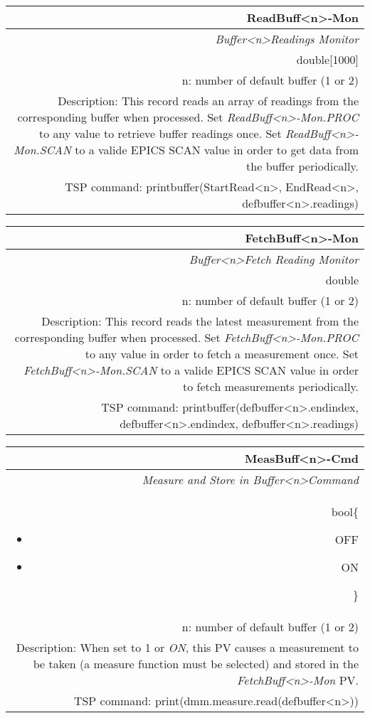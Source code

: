 \documentclass[openany]{article}
\begin{document}
		\begin{tabular}{N}
			\hline
			\bfseries ReadBuff\textless n\textgreater-Mon\label{pv:readbuff-mon} \\ \hline
			\emph{Buffer\textless n\textgreater Readings Monitor} \\
			double[1000] \\
			n: number of default buffer (1 or 2) \\
			Description: This record reads an array of readings from the corresponding buffer when processed.  Set \emph{ReadBuff\textless n\textgreater-Mon.PROC} to any value to retrieve buffer readings once. Set \emph{ReadBuff\textless n\textgreater-Mon.SCAN} to a valide EPICS SCAN value in order to get data from the buffer periodically. \\
			TSP command: printbuffer(StartRead\textless n\textgreater, EndRead\textless n\textgreater, defbuffer\textless n\textgreater.readings)
		\end{tabular}

		\begin{tabular}{N}
			\hline
			\bfseries FetchBuff\textless n\textgreater-Mon\label{pv:fetchbuff-mon} \\ \hline
			\emph{Buffer\textless n\textgreater Fetch Reading Monitor} \\
			double \\
			n: number of default buffer (1 or 2) \\
			Description: This record reads the latest measurement from the corresponding buffer when processed. Set \emph{FetchBuff\textless n\textgreater-Mon.PROC} to any value in order to fetch a measurement once. Set \emph{FetchBuff\textless n\textgreater-Mon.SCAN} to a valide EPICS SCAN value in order to fetch measurements periodically. \\
			TSP command: printbuffer(defbuffer\textless n\textgreater.endindex, defbuffer\textless n\textgreater.endindex, defbuffer\textless n\textgreater.readings)
		\end{tabular}

		\begin{tabular}{N}
			\hline
			\bfseries MeasBuff\textless n\textgreater-Cmd\label{pv:measbuff-cmd} \\ \hline
			\emph{Measure and Store in Buffer\textless n\textgreater Command} \\
			bool\{\begin{itemize}[noitemsep]
				\small
				\item[] OFF
				\item[] ON
			\end{itemize}\} \\
			n: number of default buffer (1 or 2) \\
			Description: When set to 1 or \emph{ON}, this PV causes a measurement to be taken (a measure function must be selected) and stored in the \emph{FetchBuff\textless n\textgreater-Mon} PV. \\
			TSP command: print(dmm.measure.read(defbuffer\textless n\textgreater))
		\end{tabular}
\end{document}
